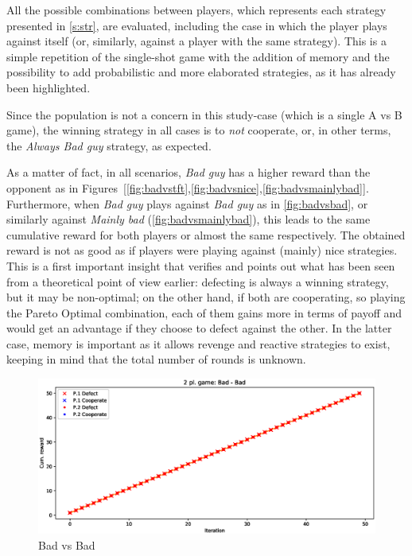 \documentclass[journal,10pt,twoside]{IEEEtran}
\begin{document}
All the possible combinations between players, which represents each strategy presented in \autoref{s:str}, are evaluated, including the case in which the player plays against itself (or, similarly, against a player with the same strategy).
This is a simple repetition of the single-shot game with the addition of memory and the possibility to add probabilistic and more elaborated strategies, as it has already been highlighted.

Since the population is not a concern in this study-case (which is a single A vs B game), the winning strategy in all cases is to \textit{not} cooperate, or, in other terms, the \textit{Always Bad guy} strategy, as expected.

As a matter of fact, in all scenarios, \textit{Bad guy} has a higher reward than the opponent as in Figures~[\ref{fig:badvstft},\ref{fig:badvsnice},\ref{fig:badvsmainlybad}]. 
Furthermore, when \textit{Bad guy} plays against \textit{Bad guy} as in \autoref{fig:badvsbad}, or similarly against \textit{Mainly bad} (\autoref{fig:badvsmainlybad}), this leads to the same cumulative reward for both players or almost the same respectively. The obtained reward is not as good as if players were playing against (mainly) nice strategies.
This is a first important insight that verifies and points out what has been seen from a theoretical point of view earlier: defecting is always a winning strategy, but it may be non-optimal; on the other hand, if both are cooperating, so playing the Pareto Optimal combination, each of them gains more in terms of payoff and would get an advantage if they choose to defect against the other. In the latter case, memory is important as it allows revenge and reactive strategies to exist, keeping in mind that the total number of rounds is unknown. 

\begin{figure}[!ht]
    \centering
    \includegraphics[width=1\columnwidth]{../img/ipd2p/ipd2p-rewards-Bad-Bad}
    \caption{Bad vs Bad}
    \label{fig:badvsbad}
\end{figure}
\end{document}

